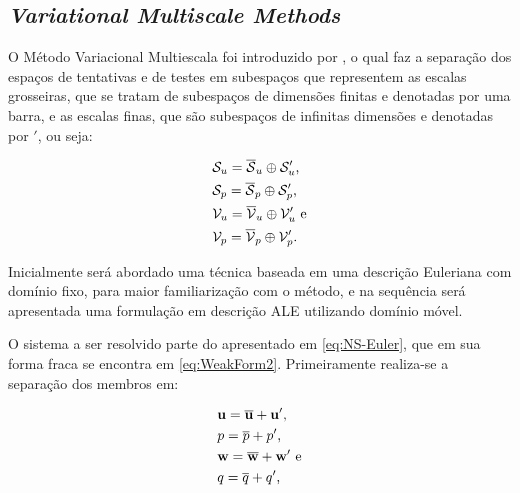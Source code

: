 \documentclass[_ArquivoPrincipal.tex]{subfiles}
\begin{document}
\subsection{\textit{Variational Multiscale Methods}} \label{VMS}

O Método Variacional Multiescala foi introduzido por , o qual faz a separação dos espaços de tentativas e de testes em subespaços que representem as escalas grosseiras, que se tratam de subespaços de dimensões finitas e denotadas por uma barra, e as escalas finas, que são subespaços de infinitas dimensões e denotadas por $'$, ou seja:

\begin{subequations}
    \begin{align}
         & \mathcal{S}_u=\overline{\mathcal{S}}_u\oplus\mathcal{S}'_u\text{,}  \\
         & \mathcal{S}_p=\overline{\mathcal{S}}_p\oplus\mathcal{S}'_p\text{,}  \\
         & \mathcal{V}_u=\overline{\mathcal{V}}_u\oplus\mathcal{V}'_u\text{ e} \\
         & \mathcal{V}_p=\overline{\mathcal{V}}_p\oplus\mathcal{V}'_p\text{.}
    \end{align}
\end{subequations}

Inicialmente será abordado uma técnica baseada em uma descrição Euleriana com domínio fixo, para maior familiarização com o método, e na sequência será apresentada uma formulação em descrição ALE utilizando domínio móvel.

O sistema a ser resolvido parte do apresentado em \ref{eq:NS-Euler}, que em sua forma fraca se encontra em \ref{eq:WeakForm2}. Primeiramente realiza-se a separação dos membros em:

\begin{subequations}
    \begin{align}
         & \mathbf{u}=\overline{\mathbf{u}}+\mathbf{u}'\text{,}  \\
         & p=\overline{p}+p'\text{,}            \\
         & \mathbf{w}=\overline{\mathbf{w}}+\mathbf{w}'\text{ e} \\
         & q=\overline{q}+q'\text{,}
    \end{align}
\end{subequations}
\end{document}
